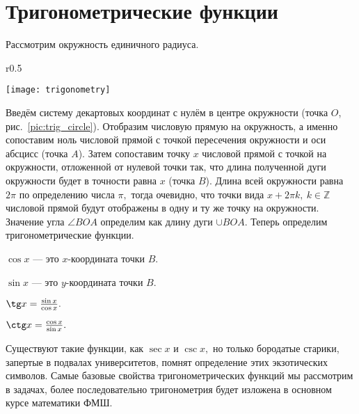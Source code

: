 \section{Тригонометрические функции}
Рассмотрим окружность единичного радиуса.
\begin{wrapfigure}{r}{0.5\textwidth}
 \begin{center}
  \texttt{[image: trigonometry]}
 \end{center}
 \caption{Единичная окружность}
 \label{pic:trig_circle}
\end{wrapfigure}
Введём систему декартовых
координат с нулём в центре окружности (точка $O$, рис.~\ref{pic:trig_circle}).
Отобразим числовую прямую на окружность,
а именно сопоставим ноль числовой прямой с точкой пересечения окружности и оси абсцисс (точка $A$).
Затем сопоставим точку $x$ числовой прямой с точкой на окружности, отложенной от
нулевой точки так, что длина полученной дуги окружности будет в точности равна $x$ (точка $B$).
Длина всей окружности равна $2\pi$ по определению числа $\pi,$ тогда очевидно,
что точки вида $x+2\pi k,~k\in \mathbb{Z}$ числовой прямой будут отображены в одну и ту же
точку на окружности. Значение угла $\angle BOA$ определим как длину дуги $\cup BOA.$ Теперь
определим тригонометрические функции.
\begin{definition}[Косинус]
$\cos x$ --- это $x$-координата точки $B.$
\end{definition}
\begin{definition}[Синус]
$\sin x$ --- это $y$-координата точки $B.$
\end{definition}
\begin{definition}[Тангенс]
$\tg x = \frac {\sin x}{\cos x}.$
\end{definition}
\begin{definition}[Котангенс]
$\ctg x = \frac {\cos x}{\sin x}.$
\end{definition}
Существуют такие функции, как $\sec x$ и $\csc x,$ но только бородатые старики,
запертые в подвалах университетов, помнят определение этих экзотических символов.
Самые базовые свойства тригонометрических функций мы рассмотрим в задачах, более
последовательно тригонометрия будет изложена в основном курсе математики ФМШ.
